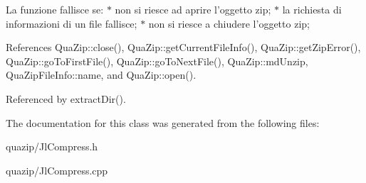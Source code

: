La funzione fallisce se: $\ast$ non si riesce ad aprire l'oggetto zip; $\ast$ la richiesta di informazioni di un file fallisce; $\ast$ non si riesce a chiudere l'oggetto zip; 

References QuaZip::close(), QuaZip::getCurrentFileInfo(), QuaZip::getZipError(), QuaZip::goToFirstFile(), QuaZip::goToNextFile(), QuaZip::mdUnzip, QuaZipFileInfo::name, and QuaZip::open().



Referenced by extractDir().



The documentation for this class was generated from the following files:\begin{DoxyCompactItemize}
\item 
quazip/JlCompress.h\item 
quazip/JlCompress.cpp\end{DoxyCompactItemize}
